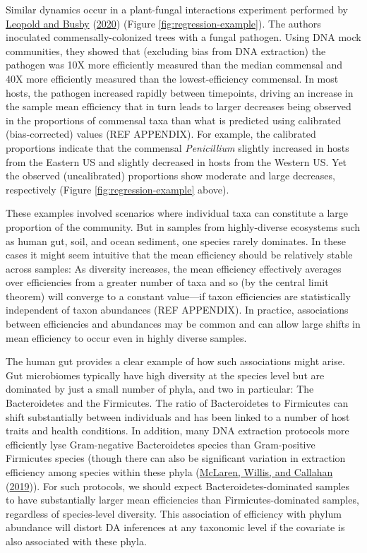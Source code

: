 \documentclass[
]{article}
\theoremstyle{definition}
\theoremstyle{definition}
\theoremstyle{definition}
\theoremstyle{definition}
\theoremstyle{remark}
\begin{document}
Similar dynamics occur in a plant-fungal interactions experiment performed by \protect\hyperlink{ref-leopold2020host}{Leopold and Busby} (\protect\hyperlink{ref-leopold2020host}{2020}) (Figure \ref{fig:regression-example}).
The authors inoculated commensally-colonized trees with a fungal pathogen.
Using DNA mock communities, they showed that (excluding bias from DNA extraction) the pathogen was 10X more efficiently measured than the median commensal and 40X more efficiently measured than the lowest-efficiency commensal.
In most hosts, the pathogen increased rapidly between timepoints, driving an increase in the sample mean efficiency that in turn leads to larger decreases being observed in the proportions of commensal taxa than what is predicted using calibrated (bias-corrected) values (REF APPENDIX).
For example, the calibrated proportions indicate that the commensal \emph{Penicillium} slightly increased in hosts from the Eastern US and slightly decreased in hosts from the Western US.
Yet the observed (uncalibrated) proportions show moderate and large decreases, respectively (Figure \ref{fig:regression-example} above).

These examples involved scenarios where individual taxa can constitute a large proportion of the community.
But in samples from highly-diverse ecosystems such as human gut, soil, and ocean sediment, one species rarely dominates.
In these cases it might seem intuitive that the mean efficiency should be relatively stable across samples: As diversity increases, the mean efficiency effectively averages over efficiencies from a greater number of taxa and so (by the central limit theorem) will converge to a constant value---if taxon efficiencies are statistically independent of taxon abundances (REF APPENDIX).
In practice, associations between efficiencies and abundances may be common and can allow large shifts in mean efficiency to occur even in highly diverse samples.

The human gut provides a clear example of how such associations might arise.
Gut microbiomes typically have high diversity at the species level but are dominated by just a small number of phyla, and two in particular: The Bacteroidetes and the Firmicutes.
The ratio of Bacteroidetes to Firmicutes can shift substantially between individuals and has been linked to a number of host traits and health conditions.
In addition, many DNA extraction protocols more efficiently lyse Gram-negative Bacteroidetes species than Gram-positive Firmicutes species (though there can also be significant variation in extraction efficiency among species within these phyla (\protect\hyperlink{ref-mclaren2019cons}{McLaren, Willis, and Callahan} (\protect\hyperlink{ref-mclaren2019cons}{2019})).
For such protocols, we should expect Bacteroidetes-dominated samples to have substantially larger mean efficiencies than Firmicutes-dominated samples, regardless of species-level diversity.
This association of efficiency with phylum abundance will distort DA inferences at any taxonomic level if the covariate is also associated with these phyla.
\end{document}
